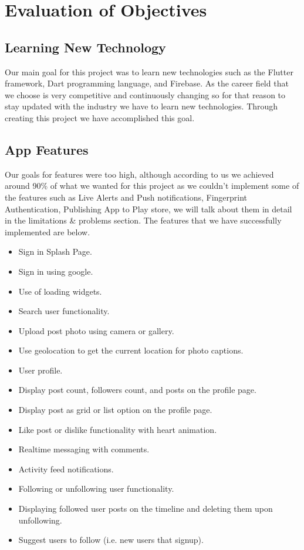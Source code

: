 \section{Evaluation of Objectives}
\subsection{Learning New Technology}
Our main goal for this project was to learn new technologies such as the Flutter framework, Dart programming language, and Firebase. As the career field that we choose is very competitive and continuously changing so for that reason to stay updated with the industry we have to learn new technologies. Through creating this project we have accomplished this goal.
\subsection{App Features}
Our goals for features were too high, although according to us we achieved around 90\% of what we wanted for this project as we couldn't implement some of the features such as Live Alerts and Push notifications, Fingerprint Authentication, Publishing App to Play store, we will talk about them in detail in the limitations \& problems section. The features that we have successfully implemented are below.
\begin{itemize}
    \item Sign in Splash Page.
    \item Sign in using google.
    \item Use of loading widgets.
    \item Search user functionality.
    \item Upload post photo using camera or gallery.
    \item Use geolocation to get the current location for photo captions.
    \item User profile.
    \item Display post count, followers count, and posts on the profile page.
    \item Display post as grid or list option on the profile page.
    \item Like post or dislike functionality with heart animation.
    \item Realtime messaging with comments.
    \item Activity feed notifications.
    \item Following or unfollowing user functionality.
    \item Displaying followed user posts on the timeline and deleting them upon
unfollowing.
    \item Suggest users to follow (i.e. new users that signup).
\end{itemize}
